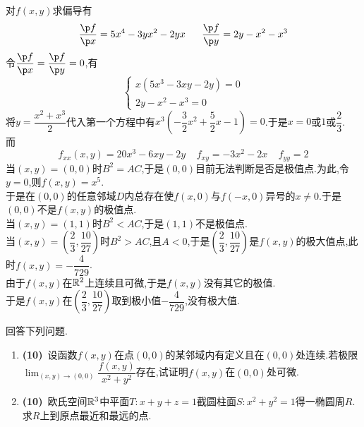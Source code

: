 \documentclass{ctexart}
\begin{document}
\begin{solution}
    对$f(x,y)$求偏导有
    \[\dfrac{\p f}{\p x}=5x^4-3yx^2-2yx\ \ \ \ \ \dfrac{\p f}{\p y}=2y-x^2-x^3\]
    令$\dfrac{\p f}{\p x}=\dfrac{\p f}{\p y}=0$,有
    \[\left\{\begin{array}{l}
        x(5x^3-3xy-2y)=0\\
        2y-x^2-x^3=0
    \end{array}\right.\]
    将$y=\dfrac{x^2+x^3}{2}$代入第一个方程中有$x^3\left(-\dfrac{3}{2}x^2+\dfrac52x-1\right)=0$.于是$x=0$或$1$或$\dfrac23$.\\
    而\[f_{xx}(x,y)=20x^3-6xy-2y\ \ \ \ \ f_{xy}=-3x^2-2x\ \ \ \ \ f_{yy}=2\]
    当$(x,y)=(0,0)$时$B^2=AC$,于是$(0,0)$目前无法判断是否是极值点.为此,令$y=0$,则$f(x,y)=x^5$.\\
    于是在$(0,0)$的任意邻域$D$内总存在使$f(x,0)$与$f(-x,0)$异号的$x\neq0$.于是$(0,0)$不是$f(x,y)$的极值点.\\
    当$(x,y)=(1,1)$时$B^2<AC$,于是$(1,1)$不是极值点.\\
    当$(x,y)=\left(\dfrac23,\dfrac{10}{27}\right)$时$B^2>AC$,且$A<0$,于是$\left(\dfrac23,\dfrac{10}{27}\right)$是$f(x,y)$的极大值点,此时$f(x,y)=-\dfrac{4}{729}$.\\
    由于$f(x,y)$在$\mathbb{R}^2$上连续且可微,于是$f(x,y)$没有其它的极值.\\
    于是$f(x,y)$在$\left(\dfrac23,\dfrac{10}{27}\right)$取到极小值$-\dfrac4{729}$,没有极大值.
\end{solution}
\begin{problem}[4.(20\songti{分})]
    回答下列问题.
    \begin{enumerate}[label=\tbf{(\arabic*)}]
        \item \textbf{(10)}\ 设函数$f(x,y)$在点$(0,0)$的某邻域内有定义且在$(0,0)$处连续.若极限$\displaystyle\lim_{(x,y)\to(0,0)}\dfrac{f(x,y)}{x^2+y^2}$存在,试证明$f(x,y)$在$(0,0)$处可微.
        \item \textbf{(10)}\ 欧氏空间$\mathbb{R}^3$中平面$T:x+y+z=1$截圆柱面$S:x^2+y^2=1$得一椭圆周$R$.求$R$上到原点最近和最远的点.
    \end{enumerate}
\end{problem}
\end{document}
